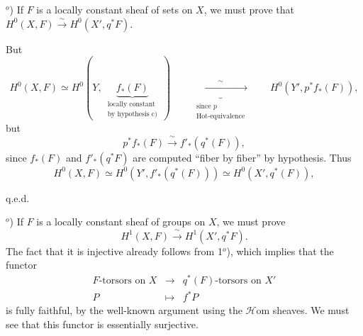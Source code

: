 
$^o$) If $F$ is a locally constant sheaf of sets on $X$, we must prove that $H^0(X,F) \xrightarrow{\sim} H^0(X', q^*F)$.


\noindent But
\[
H^0(X,F) \simeq H^0(Y,\ \underbrace{f_*(F)}_{\substack{\text{locally constant}\\ \text{by hypothesis c)}}}\ )
\qquad
\underbrace{\xrightarrow{\qquad\sim\qquad}}_{\substack{\text{since } p\\ \text{Hot-equivalence}}}
\qquad
H^0(Y', p^* f_*(F)),
\]
but
\[
p^* f_*(F) \xrightarrow{\ \sim\ } f'_*(q^*(F)),
\]
since $f_*(F)$ and $f'_*(q^*F)$ are computed ``fiber by fiber'' by hypothesis. Thus
\[
H^0(X,F) \simeq H^0(Y', f'_*(q^*(F))) \simeq H^0(X', q^*(F)),
\]

\hfill q.e.d.

$^o$) If $F$ is a locally constant sheaf of groups on $X$, we must prove %
\[
H^1(X,F) \xrightarrow{\ \sim\ } H^1(X', q^*F).
\]
The fact that it is injective already follows from 1$^o$), which implies that the functor
\[
\begin{array}{rcl}
F\text{-torsors on } X & \longrightarrow & q^*(F)\text{-torsors on } X' \\
P & \longmapsto & f^*P %
\end{array}
\]
is fully faithful, by the well-known argument using the $\mathcal{H}$om sheaves. We must see that this functor is essentially surjective.


